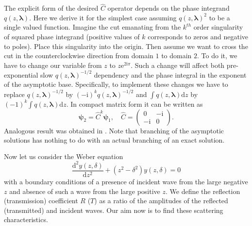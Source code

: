 \documentclass[atmp]{ipart_v1}
\def\rmd{\mathrm{d}}
\def\rme{\mathrm{e}}
\def\rmi{\mathrm{i}}
\def\lmbd{\bm{\lambda}}
\def\psii{\bm\psi}
\def\C{\widehat{C}}
\newcommand\phsintgrnd[1][z]{q(#1,\lmbd)}
\newcommand\predexp[1][z]{q(#1,\lmbd)^{-1/2}}
\begin{document}
The explicit form of the desired $\C$ operator 
depends on the phase integrand $\phsintgrnd$. Here we derive it for the simplest case  
assuming $\phsintgrnd^2$ to be a single valued function. Imagine the cut emanating from the $k^{th}$ order
singularity of squared phase integrand (positive values of $k$ corresponds to zeros and negative to poles). 
Place this singularity into the origin. Then assume we want to cross the cut in the counterclockwise  
direction from domain $1$ to domain $2$. To do it, we have to change our variable 
from $z$ to $z \rme^{2\rmi\pi}$. Such a change will affect both pre-exponential 
slow $\predexp$ dependency and the phase integral in the exponent of the asymptotic 
base. Specifically, to implement these changes we have to replace $\predexp$ by $(-\rmi)^k \predexp$ 
and $\int \phsintgrnd \rmd z$ by $(-1)^k \int \phsintgrnd \rmd z$. In compact matrix form 
it can be written as
\begin{equation}
\psii_2 = \C^k \psii_1, \quad
\C =  \left(\begin{array}{*{2}{c}} 0 & -\rmi \\ -\rmi & 0 \end{array}\right).    \label{eq:C}
\end{equation}
Analogous result was obtained in \cite{frbook}. Note that branching of the asymptotic 
solutions has nothing to do with an actual branching  of  an exact solution.

Now let us consider the Weber equation
\begin{equation}
\frac{\rmd^2 y(z,\delta)}{\rmd z^2}+(z^2-\delta^2)y(z,\delta)=0
\label{eq:weber}
\end{equation}
with a boundary conditions of a presence of incident wave from the large negative $z$ and absence of such 
a wave from the large positive $z$. We define the reflection (transmission) coefficient $R$ ($T$) as
a ratio of the amplitudes of the reflected (transmitted) and incident waves. 
Our aim now is to find these scattering characteristics.
\end{document}
